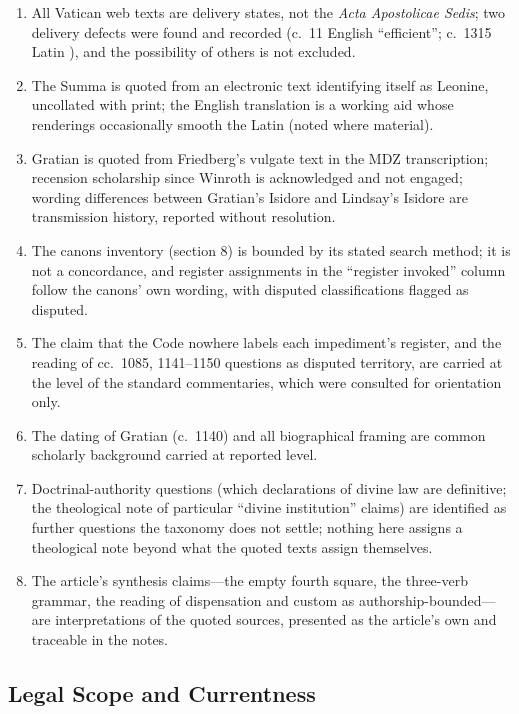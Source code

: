 \begin{enumerate}[leftmargin=1.45em,itemsep=0.25em]
\item All Vatican web texts are delivery states, not the \emph{Acta Apostolicae Sedis}; two delivery defects were found and recorded (c.~11 English ``efficient''; c.~1315 Latin ), and the possibility of others is not excluded.
\item The Summa is quoted from an electronic text identifying itself as Leonine, uncollated with print; the English translation is a working aid whose renderings occasionally smooth the Latin (noted where material).
\item Gratian is quoted from Friedberg's vulgate text in the MDZ transcription; recension scholarship since Winroth is acknowledged and not engaged; wording differences between Gratian's Isidore and Lindsay's Isidore are transmission history, reported without resolution.
\item The canons inventory (section 8) is bounded by its stated search method; it is not a concordance, and register assignments in the ``register invoked'' column follow the canons' own wording, with disputed classifications flagged as disputed.
\item The claim that the Code nowhere labels each impediment's register, and the reading of cc.~1085, 1141--1150 questions as disputed territory, are carried at the level of the standard commentaries, which were consulted for orientation only.
\item The dating of Gratian (c.~1140) and all biographical framing are common scholarly background carried at reported level.
\item Doctrinal-authority questions (which declarations of divine law are definitive; the theological note of particular ``divine institution'' claims) are identified as further questions the taxonomy does not settle; nothing here assigns a theological note beyond what the quoted texts assign themselves.
\item The article's synthesis claims---the empty fourth square, the three-verb grammar, the reading of dispensation and custom as authorship-bounded---are interpretations of the quoted sources, presented as the article's own and traceable in the notes.
\end{enumerate}

\subsection{Legal Scope and Currentness}

